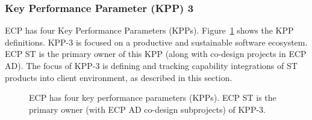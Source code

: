 \subsubsection{Key Performance Parameter (KPP) 3}

ECP has four Key Performance Parameters (KPPs).  Figure~\ref{fig:kpp-definitions} shows the KPP definitions. KPP-3 is focused on a productive and sustainable software ecosystem. ECP ST is the primary owner of this KPP (along with co-design projects in ECP AD).  The focus of KPP-3 is defining and tracking capability integrations of ST products into client environment, as described in this section. 

\begin{figure}
	\centering
	\caption{ECP has four key performance parameters (KPPs).  ECP ST is the primary owner (with ECP AD co-design subprojects) of KPP-3.}
	\label{fig:kpp-definitions}
\end{figure}



